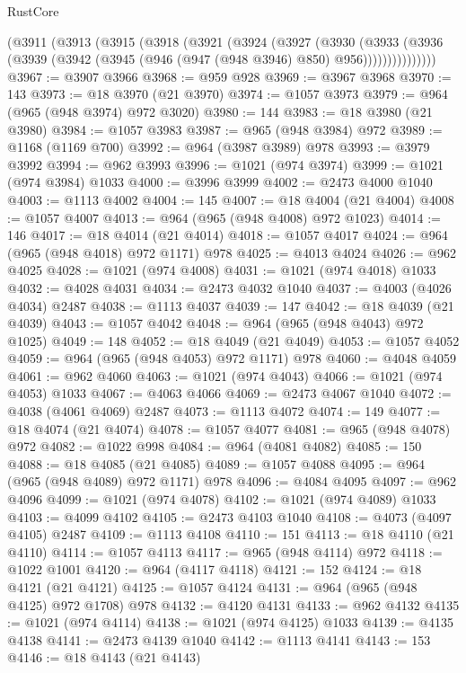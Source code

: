 \begin{lexlean}{RustCore}
\begin{coremodule}
      (@3911
        (@3913
          (@3915
            (@3918
              (@3921
                (@3924
                  (@3927
                    (@3930
                      (@3933
                        (@3936
                          (@3939 (@3942 (@3945 (@946 (@947 (@948 @3946) @850) @956)))))))))))))))
@3967 := @3907 @3966
@3968 := @959 @928
@3969 := @3967 @3968
@3970 := 143
@3973 := @18 @3970 (@21 @3970)
@3974 := @1057 @3973
@3979 := @964 (@965 (@948 @3974) @972 @3020)
@3980 := 144
@3983 := @18 @3980 (@21 @3980)
@3984 := @1057 @3983
@3987 := @965 (@948 @3984) @972
@3989 := @1168 (@1169 @700)
@3992 := @964 (@3987 @3989) @978
@3993 := @3979 @3992
@3994 := @962 @3993
@3996 := @1021 (@974 @3974)
@3999 := @1021 (@974 @3984) @1033
@4000 := @3996 @3999
@4002 := @2473 @4000 @1040
@4003 := @1113 @4002
@4004 := 145
@4007 := @18 @4004 (@21 @4004)
@4008 := @1057 @4007
@4013 := @964 (@965 (@948 @4008) @972 @1023)
@4014 := 146
@4017 := @18 @4014 (@21 @4014)
@4018 := @1057 @4017
@4024 := @964 (@965 (@948 @4018) @972 @1171) @978
@4025 := @4013 @4024
@4026 := @962 @4025
@4028 := @1021 (@974 @4008)
@4031 := @1021 (@974 @4018) @1033
@4032 := @4028 @4031
@4034 := @2473 @4032 @1040
@4037 := @4003 (@4026 @4034) @2487
@4038 := @1113 @4037
@4039 := 147
@4042 := @18 @4039 (@21 @4039)
@4043 := @1057 @4042
@4048 := @964 (@965 (@948 @4043) @972 @1025)
@4049 := 148
@4052 := @18 @4049 (@21 @4049)
@4053 := @1057 @4052
@4059 := @964 (@965 (@948 @4053) @972 @1171) @978
@4060 := @4048 @4059
@4061 := @962 @4060
@4063 := @1021 (@974 @4043)
@4066 := @1021 (@974 @4053) @1033
@4067 := @4063 @4066
@4069 := @2473 @4067 @1040
@4072 := @4038 (@4061 @4069) @2487
@4073 := @1113 @4072
@4074 := 149
@4077 := @18 @4074 (@21 @4074)
@4078 := @1057 @4077
@4081 := @965 (@948 @4078) @972
@4082 := @1022 @998
@4084 := @964 (@4081 @4082)
@4085 := 150
@4088 := @18 @4085 (@21 @4085)
@4089 := @1057 @4088
@4095 := @964 (@965 (@948 @4089) @972 @1171) @978
@4096 := @4084 @4095
@4097 := @962 @4096
@4099 := @1021 (@974 @4078)
@4102 := @1021 (@974 @4089) @1033
@4103 := @4099 @4102
@4105 := @2473 @4103 @1040
@4108 := @4073 (@4097 @4105) @2487
@4109 := @1113 @4108
@4110 := 151
@4113 := @18 @4110 (@21 @4110)
@4114 := @1057 @4113
@4117 := @965 (@948 @4114) @972
@4118 := @1022 @1001
@4120 := @964 (@4117 @4118)
@4121 := 152
@4124 := @18 @4121 (@21 @4121)
@4125 := @1057 @4124
@4131 := @964 (@965 (@948 @4125) @972 @1708) @978
@4132 := @4120 @4131
@4133 := @962 @4132
@4135 := @1021 (@974 @4114)
@4138 := @1021 (@974 @4125) @1033
@4139 := @4135 @4138
@4141 := @2473 @4139 @1040
@4142 := @1113 @4141
@4143 := 153
@4146 := @18 @4143 (@21 @4143)

\end{coremodule}
\end{lexlean}
